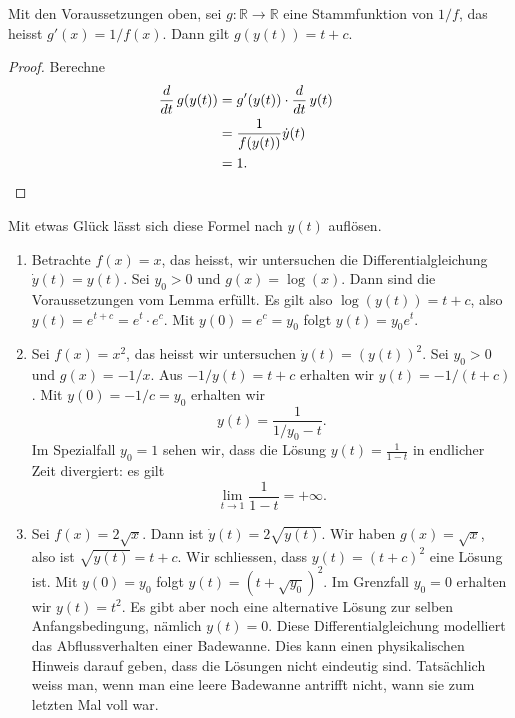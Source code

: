 \documentclass[../main.tex]{subfiles}
\begin{document}
\begin{lemma*}
  Mit den Voraussetzungen oben,
  sei $g \colon \mathbb{R} \to \mathbb{R}$ eine Stammfunktion
  von $1/f$, das heisst $g'(x) = 1/f(x)$.
  Dann gilt $g(y(t)) = t + c$.
\end{lemma*}

\begin{proof}
  Berechne
  \begin{align*}
    \frac{d}{dt} \, g(y(t))
    &= g'(y(t)) \cdot \frac{d}{dt} \, y(t)\\
    &= \frac{1}{f(y(t))} \dot y(t) \\
    &= 1. && \qedhere
  \end{align*}
\end{proof}

Mit etwas Glück lässt sich diese Formel nach $y(t)$ auflösen.

\begin{examples}
  \leavevmode
  \begin{enumerate}[(1)]
    \item Betrachte $f(x) = x$, das heisst, wir untersuchen
      die Differentialgleichung $\dot y(t) = y(t)$.
      Sei $y_0 > 0$ und $g(x) = \log(x)$.
      Dann sind die Voraussetzungen vom Lemma erfüllt.
      Es gilt also $\log(y(t)) = t + c$, also
      $y(t) = e^{t + c} = e^t \cdot e^c$.
      Mit $y(0) = e^c = y_0$ folgt $y(t) = y_0 e^t$.
    \item Sei $f(x) = x^2$, das heisst
      wir untersuchen $\dot y(t) = {(y(t))}^2$.
      Sei $y_0 > 0$ und
      $g(x) = -1/x$.
      Aus $-1/y(t) = t + c$ erhalten wir
      $y(t) = -1/(t + c)$.
      Mit  $y(0) = -1/c = y_0$ erhalten wir
      \[
        y(t) = \frac{1}{1/y_0 - t}.
      \]
      Im Spezialfall $y_0 = 1$ sehen wir,
      dass die Lösung $y(t) = \frac{1}{1-t}$ 
      in endlicher Zeit divergiert: es gilt
      \[
        \lim_{t \to 1} \frac{1}{1-t} = +\infty.
      \]
    \item Sei $f(x) = 2\sqrt x$. Dann ist
      $\dot y (t) = 2 \sqrt{y(t)}$.
      Wir haben $g(x) = \sqrt x$,
      also ist $\sqrt{y(t)} = t + c$.
      Wir schliessen, dass
      $y(t) = {(t + c)}^2$ eine Lösung
      ist.
      Mit $y(0) = y_0$ folgt
      $y(t) = {(t + \sqrt {y_0})}^2$.
      Im Grenzfall  $y_0 = 0$ 
      erhalten wir $y(t) = t^2$.
      Es gibt aber noch eine alternative
      Lösung zur selben Anfangsbedingung,
      nämlich $y(t) = 0$.
      Diese Differentialgleichung modelliert das
      Abflussverhalten einer Badewanne.
      Dies kann einen physikalischen Hinweis darauf geben, dass
      die Lösungen nicht eindeutig sind. Tatsächlich
      weiss man, wenn man eine leere Badewanne antrifft
      nicht, wann sie zum letzten Mal voll war.
  \end{enumerate}
\end{examples}
\end{document}
